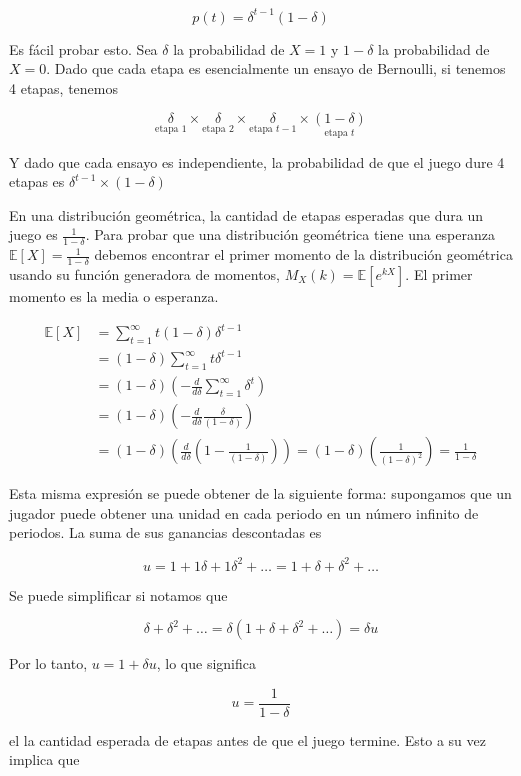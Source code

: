 \documentclass[12pt]{scrartcl}
\begin{document}
\[ 
    p(t)=\delta^{t-1}(1-\delta)
\]

Es fácil probar esto. Sea $ \delta $ la probabilidad de $ X = 1 $ y $1-\delta$ la probabilidad de $ X = 0 $. Dado que cada etapa es esencialmente un ensayo de Bernoulli, si tenemos 4 etapas, tenemos 

\[
	\underset{\text{etapa 1}}{\delta} \times \underset{\text{etapa 2}}{\delta}\times \underset{\text{etapa } t - 1}{\delta}\times \underset{\text{etapa } t}{(1-\delta)}
\]

Y dado que cada ensayo es independiente, la probabilidad de que el juego dure 4 etapas es $ \delta^{t-1}\times(1-\delta) $

En una distribución geométrica, la cantidad de etapas esperadas que dura un juego es $\frac{1}{1-\delta}$. Para probar que una distribución geométrica tiene una esperanza $ \mathbb{E}[X] = \frac{1}{1-\delta} $ debemos encontrar el primer momento de la distribución geométrica usando su función generadora de momentos, $ M_X(k) = \mathbb{E}[e^{kX}]$. El primer momento es la media o esperanza.

\begin{align*}
	\mathbb{E}[X]&=\sum_{t=1}^{\infty}t(1-\delta)\delta^{t-1} \\
	&=(1-\delta)\sum_{t=1}^{\infty}t\delta^{t-1} \\
	&=(1-\delta)\left(-\frac{d}{d\delta}\sum_{t=1}^{\infty}\delta^t\right) \\
	&=(1-\delta)\left(-\frac{d}{d\delta}\frac{\delta}{(1-\delta)}\right) \\
	&=(1-\delta)\left(\frac{d}{d\delta}\left(1-\frac{1}{(1-\delta)}\right)\right)=(1-\delta)\left(\frac{1}{(1-\delta)^2}\right)=\frac{1}{1-\delta}
\end{align*}

Esta misma expresión se puede obtener de la siguiente forma: supongamos que un jugador puede obtener una unidad en cada periodo en un número infinito de periodos. La suma de sus ganancias descontadas es

\[ 
u = 1 + 1\delta + 1\delta^2 + \dots = 1 + \delta + \delta^2 + \dots
\]

Se puede simplificar si notamos que

\[ 
    \delta + \delta^2 + \dots = \delta(1 + \delta + \delta^2 + \dots) = \delta u
\]

Por lo tanto, $u=1+\delta u$, lo que significa 

\[u = \frac{1}{1-\delta} \]

el la cantidad esperada de etapas antes de que el juego termine. Esto a su vez implica que
\end{document}
